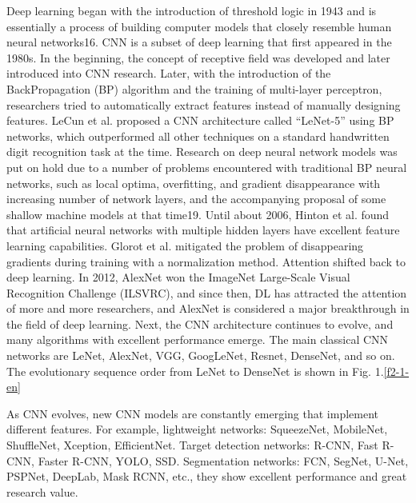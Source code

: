 Deep learning began with the introduction of threshold logic in 1943 and is essentially a process of building computer models that closely resemble human neural networks16. CNN is a subset of deep learning that first appeared in the 1980s. In the beginning, the concept of receptive field was developed and later introduced into CNN research. Later, with the introduction of the BackPropagation (BP) algorithm and the training of multi-layer perceptron, researchers tried to automatically extract features instead of manually designing features. LeCun et al. proposed a CNN architecture called “LeNet-5” using BP networks, which outperformed all other techniques on a standard handwritten digit recognition task at the time. Research on deep neural network models was put on hold due to a number of problems encountered with traditional BP neural networks, such as local optima, overfitting, and gradient disappearance with increasing number of network layers, and the accompanying proposal of some shallow machine models at that time19. Until about 2006, Hinton et al. found that artificial neural networks with multiple hidden layers have excellent feature learning capabilities. Glorot et al. mitigated the problem of disappearing gradients during training with a normalization method. Attention shifted back to deep learning. In 2012, AlexNet won the ImageNet Large-Scale Visual Recognition Challenge (ILSVRC), and since then, DL has attracted the attention of more and more researchers, and AlexNet is considered a major breakthrough in the field of deep learning. Next, the CNN architecture continues to evolve, and many algorithms with excellent performance emerge. The main classical CNN networks are LeNet, AlexNet, VGG, GoogLeNet, Resnet, DenseNet, and so on. The evolutionary sequence order from LeNet to DenseNet is shown in Fig. 1.\ref{f2-1-en}


As CNN evolves, new CNN models are constantly emerging that implement different features. For example, lightweight networks: SqueezeNet, MobileNet, ShuffleNet, Xception, EfficientNet. Target detection networks: R-CNN, Fast R-CNN, Faster R-CNN, YOLO, SSD. Segmentation networks: FCN, SegNet, U-Net, PSPNet, DeepLab, Mask RCNN, etc., they show excellent performance and great research value.

